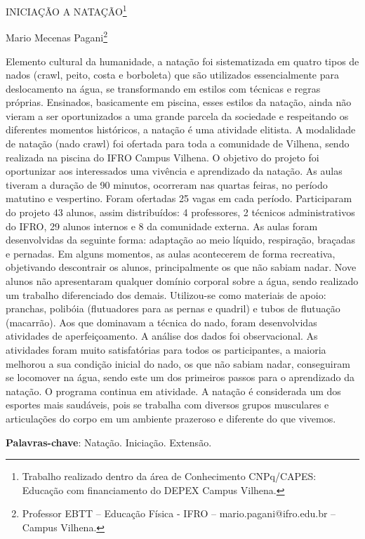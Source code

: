 \documentclass[article,12pt,onesidea,4paper,english,brazil]{abntex2}
\begin{document}
	
	
	\frenchspacing 
	
	\begin{center}
		\LARGE INICIAÇÃO A NATAÇÃO\footnote{Trabalho realizado dentro da área de Conhecimento CNPq/CAPES: Educação com financiamento do DEPEX Campus Vilhena.}
		
		\normalsize
		Mario Mecenas Pagani\footnote{Professor EBTT – Educação Física - IFRO – mario.pagani@ifro.edu.br – Campus Vilhena.} 
	\end{center}
	
	\noindent Elemento cultural da humanidade, a natação foi sistematizada em quatro tipos de nados (crawl, peito, costa e borboleta) que são utilizados essencialmente para deslocamento na água, se transformando em estilos com técnicas e regras próprias. Ensinados, basicamente em piscina, esses estilos da natação, ainda não vieram a ser oportunizados a uma grande parcela da sociedade e respeitando os diferentes momentos históricos, a natação é uma atividade elitista. A modalidade de natação (nado crawl) foi ofertada para toda a comunidade de Vilhena, sendo realizada na piscina do IFRO Campus Vilhena. O objetivo do projeto foi oportunizar aos interessados uma vivência e aprendizado da natação. As aulas tiveram a duração de 90 minutos, ocorreram nas quartas feiras, no período matutino e vespertino. Foram ofertadas 25 vagas em cada período. Participaram do projeto 43 alunos, assim distribuídos: 4 professores, 2 técnicos administrativos do IFRO, 29 alunos internos e 8 da comunidade externa. As aulas foram desenvolvidas da seguinte forma: adaptação ao meio líquido, respiração, braçadas e pernadas. Em alguns momentos, as aulas acontecerem de forma recreativa, objetivando descontrair os alunos, principalmente os que não sabiam nadar. Nove alunos não apresentaram qualquer domínio corporal sobre a água, sendo realizado um trabalho diferenciado dos demais. Utilizou-se como materiais de apoio: pranchas, polibóia (flutuadores para as pernas e quadril) e tubos de flutuação (macarrão). Aos que dominavam a técnica do nado, foram desenvolvidas atividades de aperfeiçoamento. A análise dos dados foi observacional. As atividades foram muito satisfatórias para todos os participantes, a maioria melhorou a sua condição inicial do nado, os que não sabiam nadar, conseguiram se locomover na água, sendo este um dos primeiros passos para o aprendizado da natação. O programa continua em atividade. A natação é considerada um dos esportes mais saudáveis, pois se trabalha com diversos grupos musculares e articulações do corpo em um ambiente prazeroso e diferente do que vivemos.
	
	\vspace{\onelineskip}
	
	\noindent
	\textbf{Palavras-chave}: Natação. Iniciação. Extensão.
	
\end{document}
